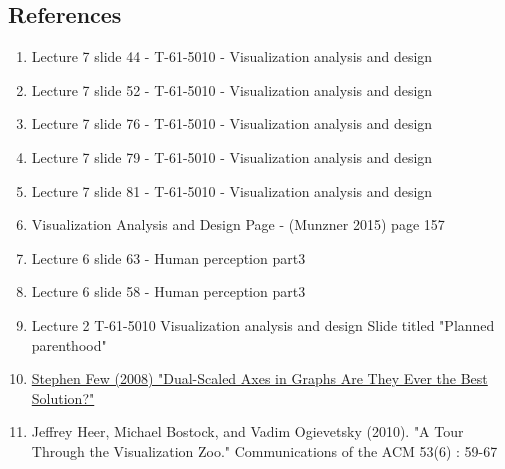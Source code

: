 \documentclass[a4paper,11pt]{article}
\begin{document}
\begin{multicols}{2}
\section*{References}
\begin{enumerate}
	\item Lecture 7 slide 44 - T-61-5010 - Visualization analysis and design  \label{1}
	\item Lecture 7 slide 52 - T-61-5010 - Visualization analysis and design \label{2}
	\item Lecture 7 slide 76 - T-61-5010 -  Visualization analysis and design \label{3}
	\item Lecture 7 slide 79 - T-61-5010 -  Visualization analysis and design \label{5}
	\item Lecture 7 slide 81 - T-61-5010 -  Visualization analysis and design \label{facetslide}
	\item Visualization Analysis and Design Page - (Munzner 2015) page 157 \label{6}
	\item Lecture 6 slide 63 - Human perception part3 \label{7}
	\item Lecture 6 slide 58 - Human perception part3 \label{connectedness}
	\item Lecture 2 T-61-5010 Visualization analysis and design Slide titled "Planned parenthood" \label{facet}
	\item \href{http://www.perceptualedge.com/articles/visual_business_intelligence/dual-scaled_axes.pdf}{Stephen Few (2008) "Dual-Scaled Axes in Graphs
		Are They Ever the Best Solution?"} \label{8}
	\item Jeffrey Heer, Michael Bostock, and Vadim Ogievetsky (2010). "A Tour Through the Visualization Zoo." Communications of the ACM 53(6) : 59-67 \label{Heer}
\end{enumerate}
\end{multicols}
\end{document}
